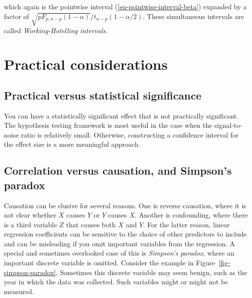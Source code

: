\documentclass[
  11pt,
  letterpaper,
  oneside]{book}
\theoremstyle{definition}
\theoremstyle{plain}
\theoremstyle{plain}
\theoremstyle{plain}
\theoremstyle{remark}
\begin{document}
which again is the pointwise interval (\ref{eq-pointwise-interval-beta})
expanded by a factor of
\(\sqrt{pF_{p, n-p}(1-\alpha)}/t_{n-p}(1-\alpha/2)\). These simultaneous
intervals are called \emph{Working-Hotelling intervals}.

\hypertarget{practical-considerations}{%
\chapter{Practical considerations}\label{practical-considerations}}

\hypertarget{practical-versus-statistical-significance}{%
\section{Practical versus statistical
significance}\label{practical-versus-statistical-significance}}

You can have a statistically significant effect that is not practically
significant. The hypothesis testing framework is most useful in the case
when the signal-to-noise ratio is relatively small. Otherwise,
constructing a confidence interval for the effect size is a more
meaningful approach.

\hypertarget{correlation-versus-causation-and-simpsons-paradox}{%
\section{Correlation versus causation, and Simpson's
paradox}\label{correlation-versus-causation-and-simpsons-paradox}}

Causation can be elusive for several reasons. One is reverse causation,
where it is not clear whether \(X\) causes \(Y\) or \(Y\) causes \(X\).
Another is confounding, where there is a third variable \(Z\) that
causes both \(X\) and \(Y\). For the latter reason, linear regression
coefficients can be sensitive to the choice of other predictors to
include and can be misleading if you omit important variables from the
regression. A special and sometimes overlooked case of this is
\emph{Simpson's paradox}, where an important discrete variable is
omitted. Consider the example in Figure~\ref{fig-simpson-paradox}.
Sometimes this discrete variable may seem benign, such as the year in
which the data was collected. Such variables might or might not be
measured.
\end{document}
